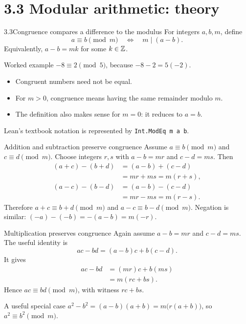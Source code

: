 \section{3.3 Modular arithmetic: theory}
\begin{frame}{3.3\quad Congruence compares a difference to the modulus}
For integers $a,b,m$, define
\[
a\equiv b\pmod m\quad\Longleftrightarrow\quad m\mid(a-b).
\]
Equivalently, $a-b=mk$ for some $k\in\mathbb{Z}$.
\begin{exampleblock}{Worked example}
$-8\equiv2\pmod5$, because $-8-2=5(-2)$.
\end{exampleblock}
\begin{itemize}
\item Congruent numbers need not be equal.
\item For $m>0$, congruence means having the same remainder modulo $m$.
\item The definition also makes sense for $m=0$: it reduces to $a=b$.
\end{itemize}
Lean's textbook notation is represented by \texttt{Int.ModEq m a b}.
\end{frame}

\begin{frame}{Addition and subtraction preserve congruence}
Assume $a\equiv b\pmod m$ and $c\equiv d\pmod m$.
Choose integers $r,s$ with $a-b=mr$ and $c-d=ms$.
Then
\[
\begin{aligned}
(a+c)-(b+d)&=(a-b)+(c-d)\\
           &=mr+ms=m(r+s),\\[.4em]
(a-c)-(b-d)&=(a-b)-(c-d)\\
           &=mr-ms=m(r-s).
\end{aligned}
\]
Therefore $a+c\equiv b+d\pmod m$ and $a-c\equiv b-d\pmod m$.
Negation is similar: $(-a)-(-b)=-(a-b)=m(-r)$.
\end{frame}

\begin{frame}{Multiplication preserves congruence}
Again assume $a-b=mr$ and $c-d=ms$. The useful identity is
\[
ac-bd=(a-b)c+b(c-d).
\]
It gives
\[
\begin{aligned}
ac-bd&=(mr)c+b(ms)\\
     &=m(rc+bs).
\end{aligned}
\]
Hence $ac\equiv bd\pmod m$, with witness $rc+bs$.
\begin{block}{A useful special case}
$a^2-b^2=(a-b)(a+b)=m\bigl(r(a+b)\bigr)$, so $a^2\equiv b^2\pmod m$.
\end{block}
\end{frame}

